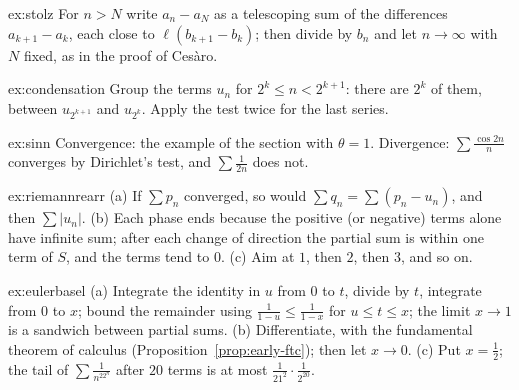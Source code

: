 \begin{hint}{ex:stolz}
For $n>N$ write $a_n-a_N$ as a telescoping sum of the differences $a_{k+1}-a_k$, each close to $\ell(b_{k+1}-b_k)$; then divide by $b_n$ and let $n\to\infty$ with $N$ fixed, as in the proof of Ces\`aro.
\end{hint}
\begin{hint}{ex:condensation}
Group the terms $u_n$ for $2^k\le n<2^{k+1}$: there are $2^k$ of them, between $u_{2^{k+1}}$ and $u_{2^k}$. Apply the test twice for the last series.
\end{hint}
\begin{hint}{ex:sinn}
Convergence: the example of the section with $\theta=1$. Divergence: $\sum\frac{\cos2n}n$ converges by Dirichlet's test, and $\sum\frac1{2n}$ does not.
\end{hint}
\begin{hint}{ex:riemannrearr}
(a) If $\sum p_n$ converged, so would $\sum q_n=\sum(p_n-u_n)$, and then $\sum|u_n|$. (b) Each phase ends because the positive (or negative) terms alone have infinite sum; after each change of direction the partial sum is within one term of $S$, and the terms tend to $0$. (c) Aim at $1$, then $2$, then $3$, and so on.
\end{hint}
\begin{hint}{ex:eulerbasel}
(a) Integrate the identity in $u$ from $0$ to $t$, divide by $t$, integrate from $0$ to $x$; bound the remainder using $\frac1{1-u}\le\frac1{1-x}$ for $u\le t\le x$; the limit $x\to1$ is a sandwich between partial sums. (b) Differentiate, with the fundamental theorem of calculus (Proposition~\ref{prop:early-ftc}); then let $x\to0$. (c) Put $x=\frac12$; the tail of $\sum\frac1{n^22^n}$ after $20$ terms is at most $\frac1{21^2}\cdot\frac1{2^{20}}$.
\end{hint}

